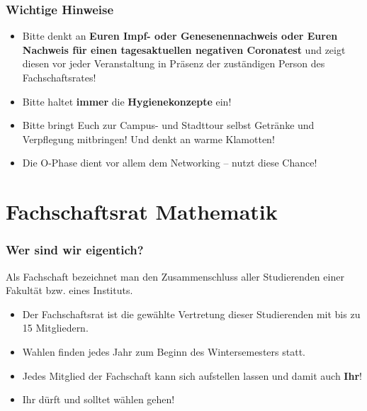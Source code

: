 \documentclass[10pt]{beamer}
\makeatletter
\newcommand{\highl}[1]{\color{tuccolor@ma}#1\color{black}}
\makeatother
\begin{document}
\begin{frame}
	\frametitle{Wichtige Hinweise}
	\begin{itemize}
		\item Bitte denkt an \textbf{Euren Impf- oder Genesenennachweis oder Euren Nachweis für einen tagesaktuellen negativen Coronatest} und zeigt diesen vor jeder Veranstaltung in Präsenz der zuständigen Person des Fachschaftsrates!
		\item Bitte haltet \textbf{immer} die \textbf{Hygienekonzepte} ein!
		\item Bitte bringt Euch zur Campus- und Stadttour selbst Getränke und Verpflegung mitbringen! Und denkt an warme Klamotten!
		\item \highl{Die O-Phase dient vor allem dem Networking -- nutzt diese Chance!}
	\end{itemize}
\end{frame}


\section{Fachschaftsrat Mathematik}
\frame{\tableofcontents[currentsection]}

\begin{frame}
	\frametitle{Wer sind wir eigentich?}

	\begin{block}{\vphantom{X}}
		Als Fachschaft bezeichnet man den Zusammenschluss aller Studierenden einer Fakultät bzw. eines Instituts.
	\end{block}

	\begin{itemize}
		\item Der Fachschaftsrat ist die gewählte Vertretung dieser Studierenden mit bis zu 15 Mitgliedern.
		\item Wahlen finden jedes Jahr zum Beginn des Wintersemesters statt.
		\item Jedes Mitglied der Fachschaft kann sich aufstellen lassen und damit auch \textbf{Ihr}!
		\item \highl{Ihr dürft und solltet wählen gehen!}
	\end{itemize}
\end{frame}
\end{document}
